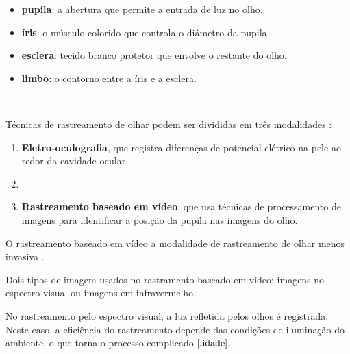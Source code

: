 \begin{itemize}
\item \textbf{pupila}: a abertura que permite a entrada de luz no olho.
\item \textbf{íris}: o músculo colorido que controla o diâmetro da pupila.
\item \textbf{esclera}: tecido branco protetor que envolve o restante do olho.
\item \textbf{limbo}: o contorno entre a íris e a esclera.
\end{itemize}


~ %

Técnicas de rastreamento de olhar podem ser divididas em três modalidades \cite{valenti2009webcam}:

\begin{enumerate}
\item {\bf Eletro-oculografia}, que registra diferenças de potencial elétrico na pele ao redor da cavidade ocular.
\item {} 

\item  {\bf Rastreamento baseado em vídeo}, que usa técnicas de processamento de imagens para identificar a posição da pupila nas imagens do olho.
\end{enumerate}

O rastreamento baseado em vídeo  a modalidade de rastreamento de olhar menos invasiva \cite{valenti2009webcam}.

Dois tipos de imagem  usados no rastramento baseado em vídeo: imagens no espectro visual ou imagens em infravermelho.

No rastreamento pelo espectro visual, a luz refletida pelos olhos é registrada. Neste caso, a eficiência do rastreamento depende das condições de iluminação do ambiente, o que torna o processo complicado $\cite{lidade}$.

